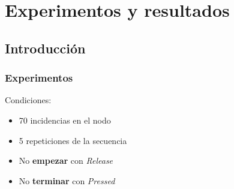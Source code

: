 \section{Experimentos y resultados}

\subsection{Introducci\'on}
\begin{frame}
\frametitle{Experimentos}

\begin{table}[]
\centering
{}
\caption{Informaci\'on de los datos recabados.}
\label{infodata}
\end{table}

\begin{block}{Condiciones:}
\centering
\begin{itemize}
\item {70 incidencias en el nodo}
\item {5 repeticiones de la secuencia}
\item {No \textbf{empezar} con \emph{Release}}
\item {No \textbf{terminar} con \emph{Pressed}}
\end{itemize}
\end{block}

\end{frame}


